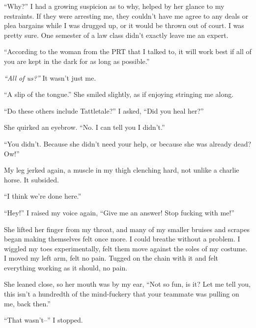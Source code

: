 ``Why?''  I had a growing suspicion as to why, helped by her glance to my restraints.  If they were arresting me, they couldn't have me agree to any deals or plea bargains while I was drugged up, or it would be thrown out of court.  I was pretty sure.  One semester of a law class didn't exactly leave me an expert.



``According to the woman from the PRT that I talked to, it will work best if all of you are kept in the dark for as long as possible.''



\emph{``All of us?''}  It wasn't just me.



``A slip of the tongue.'' She smiled slightly, as if enjoying stringing me along.



``Do these others include Tattletale?'' I asked, ``Did you heal her?''



She quirked an eyebrow.  ``No.  I can tell you I didn't.''



``You didn't.  Because she didn't need your help, or because she was already dead?  Ow!''



My leg jerked again, a muscle in my thigh clenching hard, not unlike a charlie horse.  It subsided.



``I think we're done here.''



``Hey!'' I raised my voice again, ``Give me an answer!  Stop fucking with me!''



She lifted her finger from my throat, and many of my smaller bruises and scrapes began making themselves felt once more.  I could breathe without a problem.  I wiggled my toes experimentally, felt them move against the soles of my costume.  I moved my left arm, felt no pain.  Tugged on the chain with it and felt everything working as it should, no pain.



She leaned close, so her mouth was by my ear, ``Not so fun, is it?  Let me tell you, this isn't a hundredth of the mind-fuckery that your teammate was pulling on me, back then.''



``That wasn't--'' I stopped.



